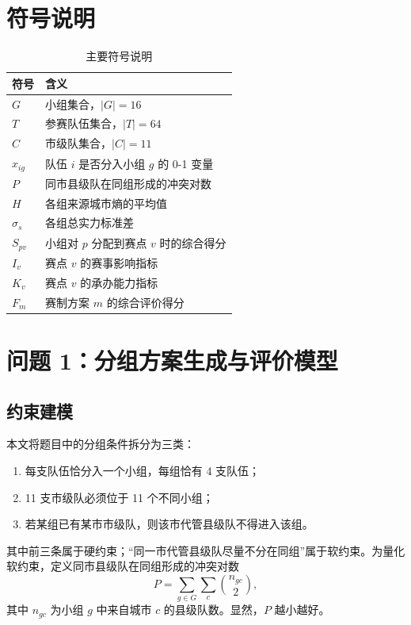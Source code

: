\documentclass[UTF8,a4paper,12pt]{ctexart}
\begin{document}
\section{符号说明}

\begin{table}[H]
\centering
\caption{主要符号说明}
\begin{tabular}{>{\centering\arraybackslash}p{} p{}}
\toprule
符号 & 含义 \\
\midrule
$G$ & 小组集合，$|G|=16$ \\
$T$ & 参赛队伍集合，$|T|=64$ \\
$C$ & 市级队集合，$|C|=11$ \\
$x_{ig}$ & 队伍 $i$ 是否分入小组 $g$ 的 0-1 变量 \\
$P$ & 同市县级队在同组形成的冲突对数 \\
$H$ & 各组来源城市熵的平均值 \\
$\sigma_s$ & 各组总实力标准差 \\
$S_{pv}$ & 小组对 $p$ 分配到赛点 $v$ 时的综合得分 \\
$I_v$ & 赛点 $v$ 的赛事影响指标 \\
$K_v$ & 赛点 $v$ 的承办能力指标 \\
$F_m$ & 赛制方案 $m$ 的综合评价得分 \\
\bottomrule
\end{tabular}
\end{table}

\section{问题 1：分组方案生成与评价模型}

\subsection{约束建模}

本文将题目中的分组条件拆分为三类：

\begin{enumerate}
  \item 每支队伍恰分入一个小组，每组恰有 4 支队伍；
  \item 11 支市级队必须位于 11 个不同小组；
  \item 若某组已有某市市级队，则该市代管县级队不得进入该组。
\end{enumerate}

其中前三条属于硬约束；“同一市代管县级队尽量不分在同组”属于软约束。为量化软约束，定义同市县级队在同组形成的冲突对数
\[
P=\sum_{g\in G}\sum_c \binom{n_{gc}}{2},
\]
其中 $n_{gc}$ 为小组 $g$ 中来自城市 $c$ 的县级队数。显然，$P$ 越小越好。
\end{document}
